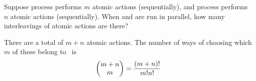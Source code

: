 \begin{nontutequestion}
Suppose process  performs $m$ atomic actions (sequentially), and
process  performs $n$ atomic actions (sequentially).  When 
and  are run in parallel, how many interleavings of atomic actions
are there?
\end{nontutequestion}
%
\begin{nontuteanswer}
There are a total of $m+n$ atomic actions.  The number of ways of choosing
which $m$ of these belong to~ is
\[
\left( \begin{array}{@{}c@{}} m+n \\ m \end{array} \right) =
\frac{(m+n)!}{m! n!}
\]
\end{nontuteanswer}

